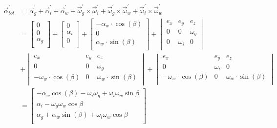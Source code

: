 \begin{equation}
\begin{split}
\vec{\alpha}_{tot}^{'} &= \vec{\alpha}_{g}^{'} + \vec{\alpha}_{i}^{'} + \vec{\alpha}_{w}^{'} + \vec{\omega}_{g}^{'} \times \vec{\omega}_{i}^{'} + \vec{\omega}_{g}^{'} \times \vec{\omega}_{w}^{'} + \vec{\omega}_{i}^{'} \times \vec{\omega}_{w}^{'}\\
&=\begin{bmatrix}
0						\\
0						\\
\alpha_{g}	\\
\end{bmatrix}
+\begin{bmatrix}
0						\\
\alpha_{i}	\\
0						\\
\end{bmatrix}
+\begin{bmatrix}
-\alpha_{w}\cdot \cos(\beta)	\\
0						\\
\alpha_{w}\cdot \sin(\beta)	\\
\end{bmatrix}
+\begin{vmatrix}
e_{x}&e_{y}&e_{z}\\
0&0&\omega_{g}\\
0&\omega_{i}&0\\
\end{vmatrix}\\
&+\begin{vmatrix}
e_{x}&e_{y}&e_{z}\\
0&0&\omega_{g}\\
-\omega_{w}\cdot \cos(\beta)&0&\omega_{w}\cdot \sin(\beta)\\
\end{vmatrix}
+\begin{vmatrix}
e_{x}&e_{y}&e_{z}\\
0&\omega_{i}&0\\
-\omega_{w}\cdot \cos(\beta)&0&\omega_{w}\cdot \sin(\beta)\\
\end{vmatrix}\\
&=\begin{bmatrix}
-\alpha_{w}\cos(\beta)-\omega_{i}\omega_{g}+\omega_{i}\omega_{w}\sin{\beta}\\
\alpha_{i}-\omega_{g}\omega_{w}\cos{\beta}\\
\alpha_{g}+	\alpha_{w} \sin(\beta)+\omega_{i}\omega_{w}\cos{\beta}\\
\end{bmatrix}
\label{eq:kin2.5}
\end{split}
\end{equation}
